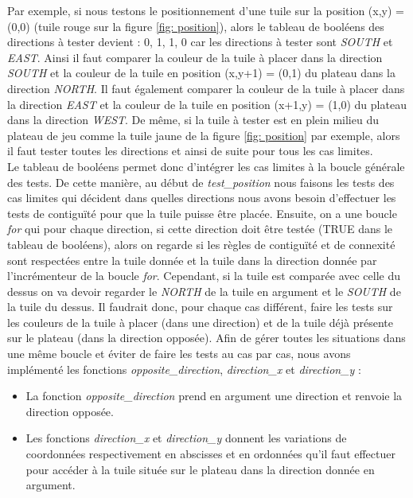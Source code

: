 \documentclass[11pt]{article}
\begin{document}
Par exemple, si nous testons le positionnement d'une tuile sur la position (x,y) = (0,0) (tuile rouge sur la figure \ref{fig: position}), alors le tableau de booléens des directions à tester devient : {0, 1, 1, 0} car les directions à tester sont \emph{SOUTH} et \emph{EAST}. Ainsi il faut comparer la couleur de la tuile à placer dans la direction \emph{SOUTH} et la couleur de la tuile en position (x,y+1) = (0,1) du plateau dans la direction \emph{NORTH}. Il faut également comparer la couleur de la tuile à placer dans la direction \emph{EAST} et la couleur de la tuile en position (x+1,y) = (1,0) du plateau dans la direction \emph{WEST}. De même, si la tuile à tester est en plein milieu du plateau de jeu comme la tuile jaune de la figure \ref{fig: position} par exemple, alors il faut tester toutes les directions et ainsi de suite pour tous les cas limites. \\

Le tableau de booléens permet donc d'intégrer les cas limites à la boucle générale des tests. De cette manière, au début de \emph{test\_position} nous faisons les tests des cas limites qui décident dans quelles directions nous avons besoin d'effectuer les tests de contiguïté pour que la tuile puisse être placée. Ensuite, on a une boucle \emph{for} qui pour chaque direction, si cette direction doit être testée (TRUE dans le tableau de booléens), alors on regarde si les règles de contiguïté et de connexité sont respectées entre la tuile donnée et la tuile dans la direction donnée par l'incrémenteur de la boucle \emph{for}. Cependant, si la tuile est comparée avec celle du dessus on va devoir regarder le \emph{NORTH} de la tuile en argument et le \emph{SOUTH} de la tuile du dessus. Il faudrait donc, pour chaque cas différent, faire les tests sur les couleurs de la tuile à placer (dans une direction) et de la tuile déjà présente sur le plateau (dans la direction opposée). Afin de gérer toutes les situations dans une même boucle et éviter de faire les tests au cas par cas, nous avons implémenté les fonctions \emph{opposite\_direction}, \emph{direction\_x} et \emph{direction\_y} : \\
\begin{itemize}
    \item La fonction \emph{opposite\_direction} prend en argument une direction et renvoie la direction opposée.
   \item Les fonctions \emph{direction\_x} et \emph{direction\_y} donnent les variations de coordonnées respectivement en abscisses et en ordonnées qu'il faut effectuer pour accéder à la tuile située sur le plateau dans la direction donnée en argument. \\
\end{itemize}
\end{document}
